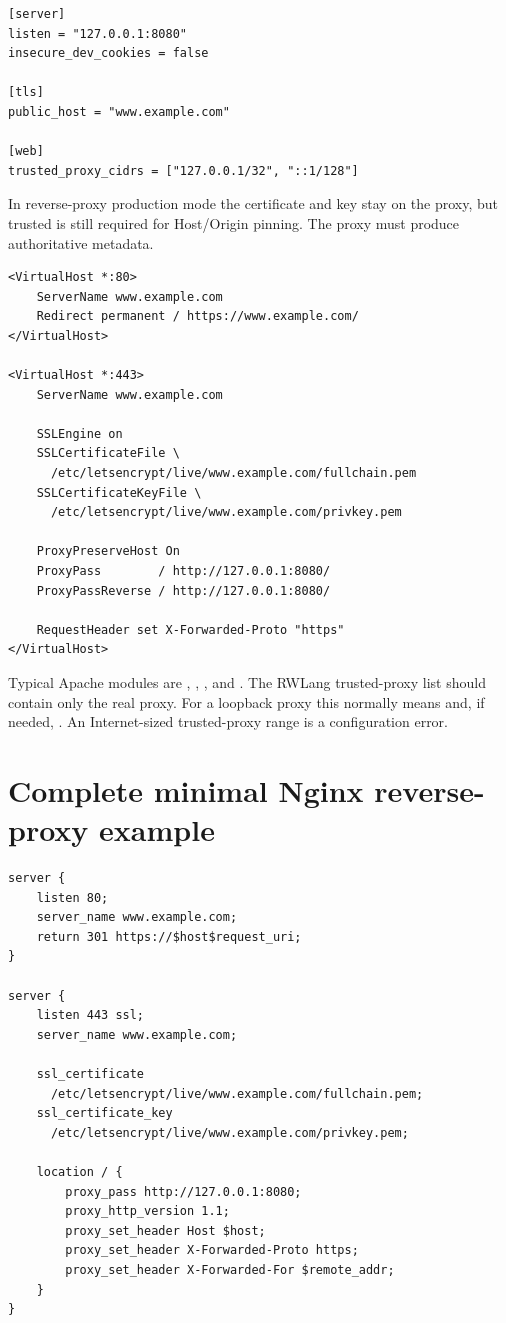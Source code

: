 \begin{lstlisting}
[server]
listen = "127.0.0.1:8080"
insecure_dev_cookies = false

[tls]
public_host = "www.example.com"

[web]
trusted_proxy_cidrs = ["127.0.0.1/32", "::1/128"]
\end{lstlisting}

In reverse-proxy production mode the certificate and key stay on the proxy, but trusted  is still required for Host/Origin pinning. The proxy must produce authoritative  metadata.

\begin{lstlisting}
<VirtualHost *:80>
    ServerName www.example.com
    Redirect permanent / https://www.example.com/
</VirtualHost>

<VirtualHost *:443>
    ServerName www.example.com

    SSLEngine on
    SSLCertificateFile \
      /etc/letsencrypt/live/www.example.com/fullchain.pem
    SSLCertificateKeyFile \
      /etc/letsencrypt/live/www.example.com/privkey.pem

    ProxyPreserveHost On
    ProxyPass        / http://127.0.0.1:8080/
    ProxyPassReverse / http://127.0.0.1:8080/

    RequestHeader set X-Forwarded-Proto "https"
</VirtualHost>
\end{lstlisting}

Typical Apache modules are , , , and . The RWLang trusted-proxy list should contain only the real proxy. For a loopback proxy this normally means  and, if needed, . An Internet-sized trusted-proxy range is a configuration error.

\section{Complete minimal Nginx reverse-proxy example}

\begin{lstlisting}
server {
    listen 80;
    server_name www.example.com;
    return 301 https://$host$request_uri;
}

server {
    listen 443 ssl;
    server_name www.example.com;

    ssl_certificate
      /etc/letsencrypt/live/www.example.com/fullchain.pem;
    ssl_certificate_key
      /etc/letsencrypt/live/www.example.com/privkey.pem;

    location / {
        proxy_pass http://127.0.0.1:8080;
        proxy_http_version 1.1;
        proxy_set_header Host $host;
        proxy_set_header X-Forwarded-Proto https;
        proxy_set_header X-Forwarded-For $remote_addr;
    }
}
\end{lstlisting}

